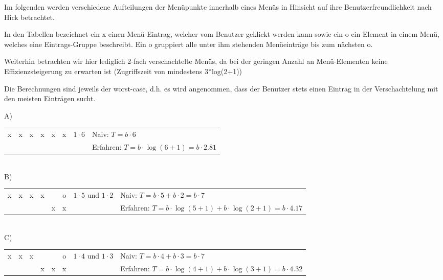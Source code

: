 \documentclass[a4paper,10pt]{article}
\begin{document}
\kopf
\renewcommand{\figurename}{Figure}

Im folgenden werden verschiedene Aufteilungen der Menüpunkte innerhalb eines Menüs in Hinsicht auf ihre Benutzerfreundlichkeit nach Hick betrachtet.

In den Tabellen bezeichnet ein x einen Menü-Eintrag, welcher vom Benutzer geklickt werden kann sowie ein o ein Element in einem Menü, welches eine Eintrags-Gruppe beschreibt. Ein o gruppiert alle unter ihm stehenden Menüeinträge bis zum nächsten o.

Weiterhin betrachten wir hier lediglich 2-fach verschachtelte Menüs, da bei der geringen Anzahl an Menü-Elementen keine Effizienzsteigerung zu erwarten ist (Zugriffszeit von mindestens 3*log(2+1))

Die Berechnungen sind jeweils der worst-case, d.h. es wird angenommen, dass der Benutzer stets einen Eintrag in der Verschachtelung mit den meisten Einträgen sucht.

A)\\
\begin{tabular}{|c|c|c|c|c|c|l|l}
\cline{1-6} x & x & x & x & x & x & $1\cdot 6$ \: \: \: \: \: \: \: & Naiv: $T = b\cdot 6$ \\
\cline{1-6}   &   &   &   &   &   &   & Erfahren: $T = b\cdot \log(6+1) = b\cdot 2.81$\\
\cline{1-6}
\end{tabular} \\

B)\\
\begin{tabular}{|c|c|c|c|c|c|l|l}
\cline{1-6} x & x & x & x &   & o & $1\cdot 5$ und $1\cdot 2$ & Naiv: $T = b\cdot 5+b\cdot 2 = b\cdot 7$ \\
\cline{1-6}   &   &   &   & x & x &   & Erfahren: $T = b\cdot \log(5+1)+b\cdot \log(2+1) = b\cdot 4.17$ \\
\cline{1-6}
\end{tabular} \\

C)\\
\begin{tabular}{|c|c|c|c|c|c|l|l}
\cline{1-6} x & x & x &   &   & o & $1\cdot 4$ und $1\cdot 3$ & Naiv: $T = b\cdot 4+b\cdot 3 = b\cdot 7$ \\
\cline{1-6}   &   &   & x & x & x &   & Erfahren: $T = b\cdot \log(4+1)+b\cdot \log(3+1) = b\cdot 4.32$ \\
\cline{1-6}
\end{tabular} \\
\end{document}
